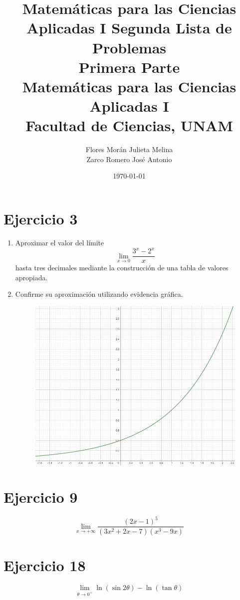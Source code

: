 \documentclass[12pt]{article}
\title{Matemáticas para las Ciencias Aplicadas I}
\title{
	Segunda Lista de Problemas \\
	\textbf{Primera Parte} \\
	\vspace{1ex}
	\large Matemáticas para las Ciencias Aplicadas I \\
	Facultad de Ciencias, UNAM}
\date{\today}
\author{Flores Morán Julieta Melina \\ Zarco Romero José Antonio}
\begin{document}
\maketitle

\section{Ejercicio 3}
\begin{enumerate}[label=(\alph*)]
\item Aproximar el valor del límite
\[
\lim_{x \to 0}\frac{3^x-2^x}{x}
\]
hasta tres decimales mediante la construcción de una tabla de valores apropiada.

\item Confirme su aproximación utilizando evidencia gráfica.
\begin{figure}[h]
\centering
\includegraphics[width=1\textwidth]{../img/img_Lista2/ej3.png}
\end{figure}
\end{enumerate}

\section{Ejercicio 9}
\[
\lim_{x \to +\infty}\frac{(2x-1)^5}{(3x^2+2x-7)(x^3-9x)}
\]

\section{Ejercicio 18}
\[
\lim_{\theta \to 0^+} \ln (\sin 2\theta) - \ln (\tan \theta)
\]
\end{document}
